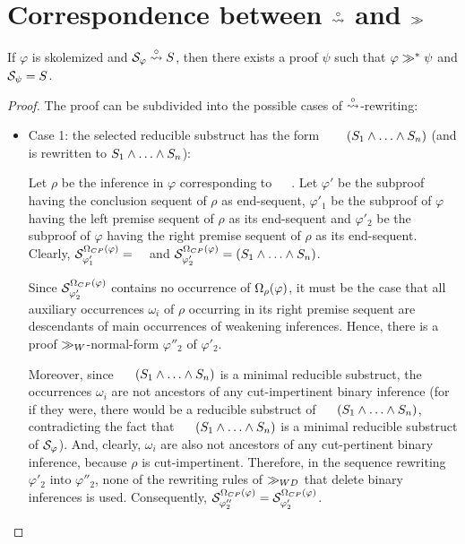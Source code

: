 
\section{Correspondence between $\stackrel{\circ}{\leadsto}$ and $\gg$}
\label{sec:Correspondence}

\begin{lemma}
\label{lemma:SwapNormalizeCorrespondence}
If $\varphi$ is skolemized and $\mathcal{S}_{\varphi} \stackrel{\circ}{\leadsto} S$, then there exists a proof $\psi$ such that $\varphi \gg^* \psi$ and $\mathcal{S}_{\psi} = S$. 
\end{lemma}
\begin{proof}

The proof can be subdivided into the possible cases of $\stackrel{\circ}{\leadsto}$-rewriting:

\begin{itemize}
	\item Case 1: the selected reducible substruct has the form $\hF{S} \hF{\structtimes_{\rho}} (S_1 \structplus \ldots \structplus S_n)$ (and is rewritten to $S_1 \wedge \ldots \wedge S_n$):

Let $\rho$ be the inference in $\varphi$ corresponding to $\hF{\structtimes_{\rho}}$. Let $\varphi'$ be the subproof having the conclusion sequent of $\rho$ as end-sequent, $\varphi'_1$ be the subproof of $\varphi$ having the left premise sequent of $\rho$ as its end-sequent and $\varphi'_2$ be the subproof of $\varphi$ having the right premise sequent of $\rho$ as its end-sequent. Clearly, $\pertstruct{\varphi'_1}{\occCutPert{\varphi}} = \hF{S}$ and $\mathcal{S}_{\varphi'_2}^{\Omega_{CP}(\varphi)} = (S_1 \wedge \ldots \wedge S_n)$. 

Since $\mathcal{S}_{\varphi'_2}^{\Omega_{CP}(\varphi)}$ contains no occurrence of $\Omega_{\rho}(\varphi)$, it must be the case that all auxiliary occurrences $\omega_i$ of $\rho$ occurring in its right premise sequent are descendants of main occurrences of weakening inferences. Hence, there is a proof $\gg_{W}$-normal-form $\varphi''_2$ of $\varphi'_2$. 

Moreover, since $\hF{S} \hF{\structtimes} (S_1 \structplus \ldots \structplus S_n)$ is a minimal reducible substruct, the occurrences $\omega_i$ are not ancestors of any cut-impertinent binary inference (for if they were, there would be a reducible substruct of $\hF{S} \hF{\structtimes} (S_1 \structplus \ldots \structplus S_n)$, contradicting the fact that $\hF{S} \hF{\structtimes} (S_1 \structplus \ldots \structplus S_n)$ is a minimal reducible substruct of $\mathcal{S}_{\varphi}$). And, clearly, $\omega_i$ are also not ancestors of any cut-pertinent binary inference, because $\rho$ is cut-impertinent. Therefore, in the sequence rewriting $\varphi'_2$ into $\varphi''_2$, none of the rewriting rules of $\gg_{WD}$ that delete binary inferences is used. Consequently, $\mathcal{S}_{\varphi''_2}^{\Omega_{CP}(\varphi)} = \mathcal{S}_{\varphi'_2}^{\Omega_{CP}(\varphi)}$.


\end{itemize}
\end{proof}

